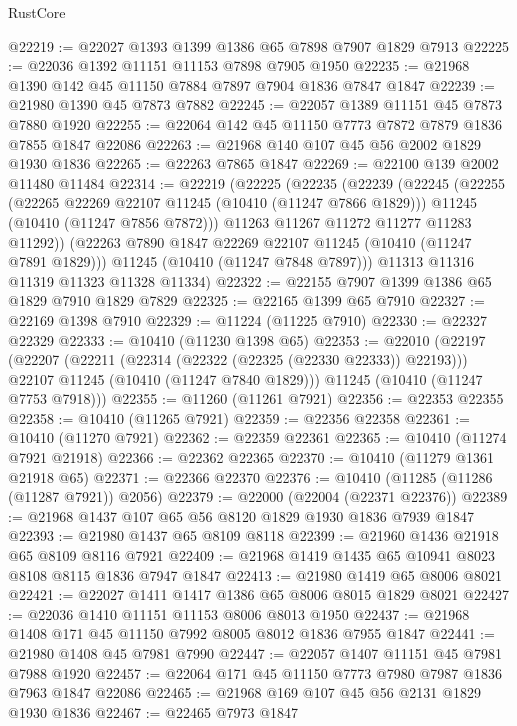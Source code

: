 \begin{lexlean}{RustCore}
\begin{coremodule}
@22219 := @22027 @1393 @1399 @1386 @65 @7898 @7907 @1829 @7913
@22225 := @22036 @1392 @11151 @11153 @7898 @7905 @1950
@22235 := @21968 @1390 @142 @45 @11150 @7884 @7897 @7904 @1836 @7847 @1847
@22239 := @21980 @1390 @45 @7873 @7882
@22245 := @22057 @1389 @11151 @45 @7873 @7880 @1920
@22255 := @22064 @142 @45 @11150 @7773 @7872 @7879 @1836 @7855 @1847 @22086
@22263 := @21968 @140 @107 @45 @56 @2002 @1829 @1930 @1836
@22265 := @22263 @7865 @1847
@22269 := @22100 @139 @2002 @11480 @11484
@22314 := @22219
    (@22225
      (@22235
        (@22239
          (@22245
            (@22255
              (@22265 @22269 @22107 @11245 (@10410 (@11247 @7866 @1829)))
              @11245
              (@10410 (@11247 @7856 @7872)))
            @11263
            @11267
            @11272
            @11277
            @11283
            @11292))
        (@22263 @7890 @1847 @22269 @22107 @11245 (@10410 (@11247 @7891 @1829)))
        @11245
        (@10410 (@11247 @7848 @7897)))
      @11313
      @11316
      @11319
      @11323
      @11328
      @11334)
@22322 := @22155 @7907 @1399 @1386 @65 @1829 @7910 @1829 @7829
@22325 := @22165 @1399 @65 @7910
@22327 := @22169 @1398 @7910
@22329 := @11224 (@11225 @7910)
@22330 := @22327 @22329
@22333 := @10410 (@11230 @1398 @65)
@22353 := @22010
    (@22197
      (@22207
        (@22211 (@22314 (@22322 (@22325 (@22330 @22333)) @22193)))
        @22107
        @11245
        (@10410 (@11247 @7840 @1829)))
      @11245
      (@10410 (@11247 @7753 @7918)))
@22355 := @11260 (@11261 @7921)
@22356 := @22353 @22355
@22358 := @10410 (@11265 @7921)
@22359 := @22356 @22358
@22361 := @10410 (@11270 @7921)
@22362 := @22359 @22361
@22365 := @10410 (@11274 @7921 @21918)
@22366 := @22362 @22365
@22370 := @10410 (@11279 @1361 @21918 @65)
@22371 := @22366 @22370
@22376 := @10410 (@11285 (@11286 (@11287 @7921)) @2056)
@22379 := @22000 (@22004 (@22371 @22376))
@22389 := @21968 @1437 @107 @65 @56 @8120 @1829 @1930 @1836 @7939 @1847
@22393 := @21980 @1437 @65 @8109 @8118
@22399 := @21960 @1436 @21918 @65 @8109 @8116 @7921
@22409 := @21968 @1419 @1435 @65 @10941 @8023 @8108 @8115 @1836 @7947 @1847
@22413 := @21980 @1419 @65 @8006 @8021
@22421 := @22027 @1411 @1417 @1386 @65 @8006 @8015 @1829 @8021
@22427 := @22036 @1410 @11151 @11153 @8006 @8013 @1950
@22437 := @21968 @1408 @171 @45 @11150 @7992 @8005 @8012 @1836 @7955 @1847
@22441 := @21980 @1408 @45 @7981 @7990
@22447 := @22057 @1407 @11151 @45 @7981 @7988 @1920
@22457 := @22064 @171 @45 @11150 @7773 @7980 @7987 @1836 @7963 @1847 @22086
@22465 := @21968 @169 @107 @45 @56 @2131 @1829 @1930 @1836
@22467 := @22465 @7973 @1847

\end{coremodule}
\end{lexlean}
